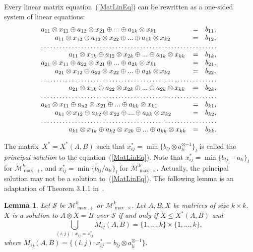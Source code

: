 \documentclass[reqno,12pt]{amsart}
\newtheorem{lemma}{Lemma}
\theoremstyle{definition}
\newcommand{\MP}{\mathcal{M}_{\max, {+}}^k}
\newcommand{\MT}{\mathcal{M}_{\max, {\times}}^k}
\begin{document}
Every linear matrix equation~(\ref{MatLinEq}) can be rewritten as a one-sided system of linear equations:
$$
    \begin{array}{lll}
        a_{11} \otimes x_{11} \oplus a_{12} \otimes x_{21} \oplus ... \oplus a_{1k} \otimes x_{k1}               & = & b_{11}, \\
        \qquad a_{11} \otimes x_{12} \oplus a_{12} \otimes x_{22} \oplus ... \oplus a_{1k} \otimes x_{k2}        & = & b_{12}, \\
        \hdotsfor{3} \\
        \qquad\qquad a_{11} \otimes x_{1k} \oplus a_{12} \otimes x_{2k} \oplus ... \oplus a_{1k} \otimes x_{kk}  & = & b_{1k}, \\
        a_{21} \otimes x_{11} \oplus a_{22} \otimes x_{21} \oplus ... \oplus a_{2k} \otimes x_{k1}               & = & b_{21}, \\
        \qquad a_{21} \otimes x_{12} \oplus a_{22} \otimes x_{22} \oplus ... \oplus a_{2k} \otimes x_{k2}        & = & b_{22}, \\
        \hdotsfor{3} \\
        \qquad\qquad a_{21} \otimes x_{1k} \oplus a_{22} \otimes x_{2k} \oplus ... \oplus a_{2k} \otimes x_{kk}  & = & b_{2k}, \\
        \hdotsfor{3}\\
        a_{k1} \otimes x_{11} \oplus a_{n2} \otimes x_{21} \oplus ... \oplus a_{kk} \otimes x_{k1}               & = & b_{k1}, \\
        \qquad a_{k1} \otimes x_{12} \oplus a_{k2} \otimes x_{22} \oplus ... \oplus a_{kk} \otimes x_{k2}        & = & b_{k2}, \\
        \hdotsfor{3} \\
        \qquad\qquad a_{k1} \otimes x_{1k} \oplus a_{k2} \otimes x_{2k} \oplus ... \oplus a_{kk} \otimes x_{kk}  & = & b_{kk}.
    \end{array}
$$

The matrix~$X^{*} = X^{*}(A, B)$ such that $x^{*}_{ij} = \min\{b_{lj} \otimes a_{li}^{\otimes {-1}}\}_{l}$ is called the \textit{principal solution} to the equation~(\ref{MatLinEq}).
Note that $x^{*}_{ij} = \min\{b_{lj} - a_{li}\}_{l}$ for $\MP$, and $x^{*}_{ij} = \min\{b_{lj} / a_{li}\}_{l}$ for $\MT$.
Actually, the principal solution may not be a solution to~(\ref{MatLinEq}).
The following lemma is an adaptation of Theorem 3.1.1 in~\cite{Butkovic2010}. 

\begin{lemma}\label{Lemma10}
    Let $\mathcal{S}$ be $\MP$ or $\MT$.
    Let $A, B, X$ be matrices of size $k \times k$. 
    $X$ is a solution to $A \otimes X = B$ over $\mathcal{S}$ if and only if $X \leq X^{*}(A, B)$ and 
    $$
        \bigcup_{(i, j) \;:\; x_{ij} = x^{*}_{ij}} M_{ij}(A, B) = \{1, \ldots, k\} \times \{1, \ldots, k\},
    $$
    where $M_{ij}(A, B) = \{(l, j) : x^{*}_{ij} = b_{lj} \otimes a_{li}^{\otimes {-1}}\}$.
\end{lemma}
\end{document}
